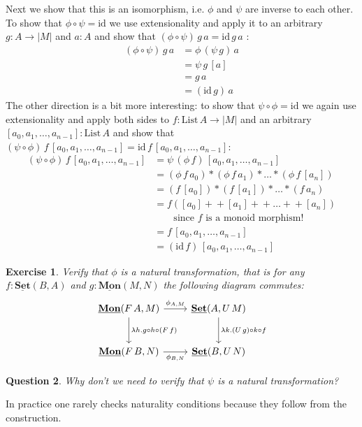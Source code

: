 \documentclass{article}
\newcommand{\Set}{\mathbf{Set}}
\newcommand{\cat}[1]{\underline{\mathbf{#1}}}
\newcommand{\id}{\mathrm{id}}
\newcommand{\List}{\mathrm{List}}
\newcommand{\app}{+\!\!+}
\newtheorem{exercise}{Exercise}
\newtheorem{question}[exercise]{Question}
\begin{document}
Next we show that this is an isomorphism, i.e. $\phi$ and $\psi$ are inverse to each other. To show that $\phi \circ \psi = \id$ we use extensionality and apply it to an arbitrary $g : A \to |M|$ and $a : A$ and show that $ (\phi \circ \psi)\,g\,a = \id\,g\,a$ : 
\begin{align*}
  (\phi \circ \psi)\,g\,a
& = \phi\,(\psi\, g)\,a\\
& = \psi\,g\,[a]\\
& = g\,a\\
& = (\id\,g)\,a
\end{align*}
The other direction is a bit more interesting: to show that $\psi \circ \phi = \id$ we again use extensionality and apply both sides to $f : \List\,A \to |M|$ and an arbitrary $[a_0,a_1,\dots,a_{n-1}] : \List\,A$ and show that $(\psi \circ \phi)\,f\,[a_0,a_1,\dots,a_{n-1}]  = \id\,f\,[a_0,a_1,\dots,a_{n-1}]$:
\begin{align*}
  (\psi \circ \phi)\,f\,[a_0,a_1,\dots,a_{n-1}] 
 & = \psi\,(\phi\,f)\, [a_0,a_1,\dots,a_{n-1}] \\
 & = (\phi\,f\,a_0) * (\phi\,f\,a_1) * \dots * (\phi\,f\,[a_n])\\
 & = (f\,[a_0]) * (f\,[a_1]) * \dots * (f\,a_n)\\
 & = f ([a_0] \app [a_1] \app \dots \app [a_n]) \\
 &\qquad \mbox{since $f$ is a monoid morphism!} \\
& = f\, [a_0,a_1,\dots,a_{n-1}] \\
& = (\id\,f)\,[a_0,a_1,\dots,a_{n-1}] 
\end{align*}

\begin{exercise}
  Verify that $\phi$ is a natural transformation, that is for any $f : \cat{Set}(B,A)$ and $g:\cat{Mon}(M,N)$ the following diagram commutes:
  \[\begin{tikzcd}[row sep = large]
    \cat{Mon}(F\,A,M) \arrow[r,"\phi_{A,M}"] \arrow[d,"\lambda h. g\circ h \circ (F\,f)"] & \cat{\Set}(A,U\,M)  \arrow[d,"\lambda k. (U\,g)\circ k \circ f"] \\
    \cat{Mon}(F\,B,N) \arrow[r,"\phi_{B,N}" below]  & \cat{\Set}(B,U\,N)  
\end{tikzcd}\]
\end{exercise}
\begin{question}
  Why don't we need to verify that $\psi$ is a natural transformation?
\end{question}
In practice one rarely checks naturality conditions because they follow from the construction. 
\end{document}
